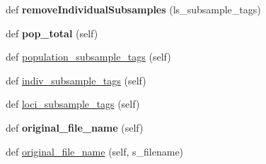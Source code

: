 \begin{DoxyCompactItemize}
\item 
def {\bfseries remove\+Individual\+Subsamples} (ls\+\_\+subsample\+\_\+tags)\hypertarget{classnegui_1_1genepopfilemanager_1_1GenepopFileManager_ae0f452a29252cdd75393effc2baa9299}{}\label{classnegui_1_1genepopfilemanager_1_1GenepopFileManager_ae0f452a29252cdd75393effc2baa9299}

\item 
def {\bfseries pop\+\_\+total} (self)\hypertarget{classnegui_1_1genepopfilemanager_1_1GenepopFileManager_afeefa4552274231bedce1fc6b8c0532d}{}\label{classnegui_1_1genepopfilemanager_1_1GenepopFileManager_afeefa4552274231bedce1fc6b8c0532d}

\item 
def \hyperlink{classnegui_1_1genepopfilemanager_1_1GenepopFileManager_ac3210c8f51c32e9e99e34703afb402d0}{population\+\_\+subsample\+\_\+tags} (self)
\item 
def \hyperlink{classnegui_1_1genepopfilemanager_1_1GenepopFileManager_ae77bd8c465db4d95839db838c236f4cd}{indiv\+\_\+subsample\+\_\+tags} (self)
\item 
def \hyperlink{classnegui_1_1genepopfilemanager_1_1GenepopFileManager_a9818ed890508a24026ea37fa734c898e}{loci\+\_\+subsample\+\_\+tags} (self)
\item 
def {\bfseries original\+\_\+file\+\_\+name} (self)\hypertarget{classnegui_1_1genepopfilemanager_1_1GenepopFileManager_a8145be8434d89aa7011831f6a6ca19a3}{}\label{classnegui_1_1genepopfilemanager_1_1GenepopFileManager_a8145be8434d89aa7011831f6a6ca19a3}

\item 
def \hyperlink{classnegui_1_1genepopfilemanager_1_1GenepopFileManager_abec8e261bad014e6488162ec43e63ef7}{original\+\_\+file\+\_\+name} (self, s\+\_\+filename)
\end{DoxyCompactItemize}
